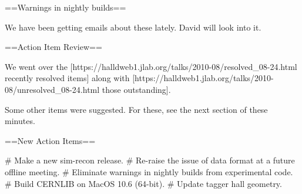==Warnings in nightly builds==

We have been getting emails about these lately. David will look into it.

==Action Item Review==

We went over the [https://halldweb1.jlab.org/talks/2010-08/resolved_08-24.html recently resolved items] along with [https://halldweb1.jlab.org/talks/2010-08/unresolved_08-24.html those outstanding].

Some other items were suggested. For these, see the next section of these minutes.

==New Action Items==

# Make a new sim-recon release.
# Re-raise the issue of data format at a future offline meeting.
# Eliminate warnings in nightly builds from experimental code.
# Build CERNLIB on MacOS 10.6 (64-bit).
# Update tagger hall geometry.

